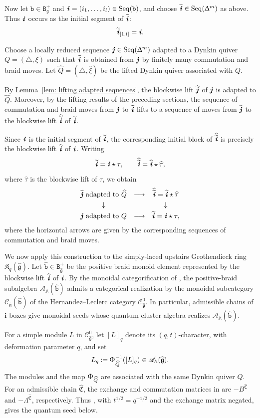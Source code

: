 \documentclass[12pt, leqno]{amsart}
\numberwithin{equation}{section}
\theoremstyle{plain}
\theoremstyle{definition}
\newcommand{\hxi}{{\widehat{\xi}}}
\newcommand{\seteq}{\mathbin{:=}}
\newcommand{\g}{\mathfrak{g}}
\newcommand{\Dynkin}{\triangle}
\newcommand{\ii}{ \textbf{\textit{i}}}
\newcommand{\jj}{ \textbf{\textit{j}}}
\newcommand{\tii}{{\widetilde{\ii}}}
\newcommand{\htii}{{\widehat{\tii}}}
\newcommand{\hQ}{\widehat{Q}}
\newcommand{\hg}{{\widehat{\g}}}
\newcommand{\htau}{\widehat{\tau}}
\newcommand{\hii}{{\widehat{\ii}}}
\newcommand{\hjj}{{\widehat{\jj}}}
\newcommand{\frakC}{\mathfrak{C}}
\newcommand{\frakK}{\mathfrak{K}}
\newcommand{\hfrakC}{\widehat{\frakC}}
\newcommand{\bbA}{\mathbb{A}}
\newcommand{\bfi}{\mathbf{i}}
\newcommand{\scrA}{\mathscr{A}}
\newcommand{\scrC}{\mathscr{C}}
\newcommand{\ttB}{\mathtt{B}}
\newcommand{\ttb}{\mathtt{b}}
\newcommand{\httb}{\widehat{\ttb}}
\newcommand{\hDynkin}{{\widehat{\Dynkin}}}
\newcommand{\Seq}{\mathrm{Seq}}
\begin{document}
Now let $\ttb\in\ttB_\g^+$ and
$\ii=(i_1,\ldots,i_l)\in\Seq(\ttb)$, and choose
$\tii\in\Seq(\Updelta^m)$ as above.  Thus $\ii$
occurs as the initial segment of $\tii$:
\[
\tii_{[1,l]}=\ii.
\]

Choose a locally reduced sequence
$\jj\in\Seq(\Updelta^m)$
adapted to a Dynkin quiver
$Q=(\Dynkin,\xi)$
such that $\tii$ is obtained from $\jj$ by finitely many commutation
and braid moves.  Let
$\hQ=(\hDynkin,\hxi)$
be the   lifted Dynkin quiver associated with $Q$.

 By Lemma~\ref{lem: lifting adapted sequences}, the blockwise lift{}
$\hjj$ of $\jj$ is adapted to $\hQ$.  Moreover, by the lifting
results of the preceding sections, the sequence of commutation and
braid moves from $\jj$ to $\tii$ lifts to a sequence of moves from
 $\hjj$ to the blockwise lift $\htii$ of $\tii$.{}

Since $\ii$ is the initial segment of $\tii$, the corresponding
 initial block of $\htii$ is precisely the blockwise lift $\hii$ of{}
$\ii$.  {}  Writing
\[
\tii=\ii\star\tau, \qquad \htii=\hii\star\htau,
\]
 where $\htau$ is the blockwise lift of $\tau$,{} we obtain
\[
\begin{array}{ccc}
\hjj\text{ adapted to }\hQ &\longrightarrow& \htii=\hii\star\htau \\[1mm]
\downarrow && \downarrow \\[1mm]
\jj\text{ adapted to }Q &\longrightarrow& \tii=\ii\star\tau,
\end{array}
\]
where the horizontal arrows are given by the corresponding sequences
of commutation and braid moves.

We now apply this construction to the simply-laced upstairs
Grothendieck ring $\frakK_q(\hg)$.  Let
$\httb\in\ttB_\hg^+$ be the positive braid monoid element represented
 by the blockwise lift $\hii$ of $\ii$.{}  By the monoidal
categorification of \cite{KKOP25M}, the positive-braid subalgebra
$\scrA_{\bbA}(\httb)$ admits a categorical realization by the
monoidal subcategory $\scrC_\hg(\httb)$ of the Hernandez--Leclerc
category $\scrC_\hg^0$.  In particular, admissible chains of $\bfi$-boxes give
monoidal seeds whose quantum cluster algebra realizes
$\scrA_{\bbA}(\httb)$.

For a simple module $L$ in $\scrC_\hg^0$, let $[L]_q$ denote
its $(q,t)$-character, with deformation parameter $q$, and set
\[
L_q\seteq\Upphi_{\hQ}^{-1}([L]_q)\in\scrA_\bbA(\hg).
\]
The modules and the map $\Upphi_{\hQ}$ are associated with the
same Dynkin quiver $\hQ$.
For an admissible chain $\hfrakC$, the exchange and commutation
matrices in \cite[Definition~9.5 and Proposition~5.20]{KKOP25M}
are $-B^{\hfrakC}$ and $-\Lambda^{\hfrakC}$, respectively.
Thus \cite[Theorem~9.7]{KKOP25M}, with $t^{1/2}=q^{-1/2}$
and the exchange matrix negated, gives the quantum seed below.
\end{document}

